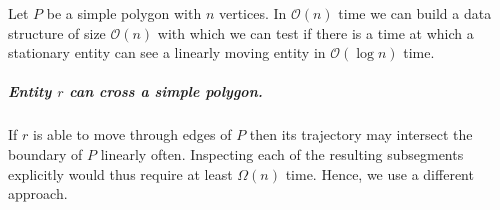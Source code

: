 \documentclass[UKenglish]{lipics-v2019}
\newcommand{\myremark}[4]{\textcolor{blue}{\textsc{#1 #2:}} \textcolor{#4}{\textsf{#3}}}
\newcommand{\frank}[2][says]{\myremark{Frank}{#1}{#2}{SeaGreen}}
\newcommand{\etal}{\textnormal{et al.}\xspace}
\newcommand{\mkmcal}[1]{\ensuremath{\mathcal{#1}}\xspace}
\renewcommand{\O}{\mkmcal{O}}
\begin{document}

\begin{theorem}
  Let $P$ be a simple polygon with $n$ vertices. In $\O(n)$ time we
  can build a data structure of size $\O(n)$ with which we can test if
  there is a time at which a stationary entity can see a linearly
  moving entity in $\O(\log n)$ time.
\end{theorem}




%

\subparagraph{Entity $r$ can cross a simple polygon.}
If $r$ is able to move through edges of $P$ then its trajectory may
intersect the boundary of $P$ linearly often. Inspecting each of the
resulting subsegments explicitly would thus require at least
$\Omega(n)$ time. Hence, we use a different approach.
\end{document}
